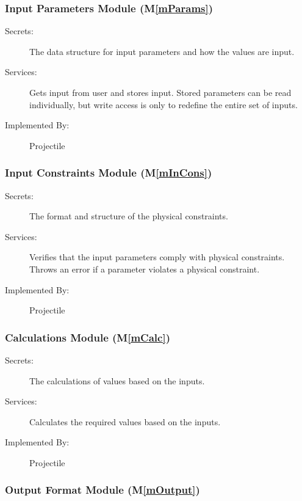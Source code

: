 \documentclass[12pt]{article}
\newcommand{\mref}[1]{M\ref{#1}}
\begin{document}
\subsubsection{Input Parameters Module (\mref{mParams})}

\begin{description}
\item[Secrets:] The data structure for input parameters and how the
values are input.
\item[Services:] Gets input from user and stores input. Stored parameters can 
  be read individually, but write access is only to redefine the entire set of inputs.
\item[Implemented By:] Projectile
\end{description}

\subsubsection{Input Constraints Module (\mref{mInCons})}

\begin{description}
\item[Secrets:] The format and structure of the physical constraints. %
\item[Services:] Verifies that the input parameters comply with physical 
  constraints. %
  Throws an error if a parameter violates a physical constraint.
\item[Implemented By:] Projectile
\end{description}

\subsubsection{Calculations Module (\mref{mCalc})}

\begin{description}
\item[Secrets:] The calculations of values based on the inputs.
\item[Services:] Calculates the required values based on the inputs.
\item[Implemented By:] Projectile
\end{description}

\subsubsection{Output Format Module (\mref{mOutput})}
\end{document}

